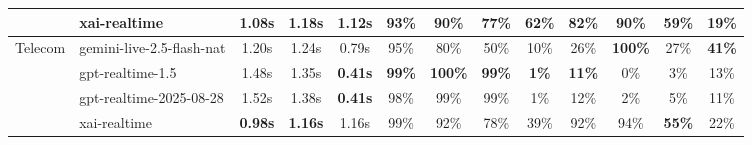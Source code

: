 \begin{tabular}{@{}ll|cc|c|cc|c|cc|ccc@{}}
 & xai-realtime & \textbf{1.08s} & \textbf{1.18s} & 1.12s & 93\% & 90\% & 77\% & 62\% & 82\% & \textbf{90\%} & \textbf{59\%} & 19\% \\
\midrule
\multirow{4}{*}{Telecom} & gemini-live-2.5-flash-nat & 1.20s & 1.24s & 0.79s & 95\% & 80\% & 50\% & 10\% & 26\% & \textbf{100\%} & 27\% & \textbf{41\%} \\
 & gpt-realtime-1.5 & 1.48s & 1.35s & \textbf{0.41s} & \textbf{99\%} & \textbf{100\%} & \textbf{99\%} & \textbf{1\%} & \textbf{11\%} & 0\% & 3\% & 13\% \\
 & gpt-realtime-2025-08-28 & 1.52s & 1.38s & \textbf{0.41s} & 98\% & 99\% & 99\% & 1\% & 12\% & 2\% & 5\% & 11\% \\
 & xai-realtime & \textbf{0.98s} & \textbf{1.16s} & 1.16s & 99\% & 92\% & 78\% & 39\% & 92\% & 94\% & \textbf{55\%} & 22\% \\
\bottomrule
\end{tabular}